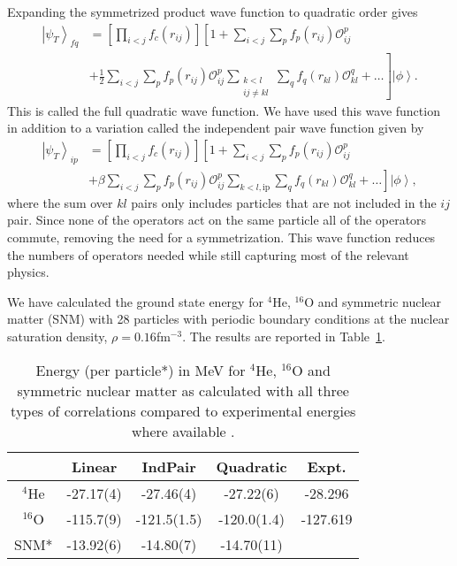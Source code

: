 \documentclass[12pt]{article}
\newcommand{\ket}[1]{\left| #1 \right>}
\newcommand{\fpij}{f_p(r_{ij})}
\newcommand{\Opij}{\mathcal{O}_{ij}^p}
\newcommand{\fOpij}{\sum\limits_{i<j}\sum\limits_p \fpij\Opij}
\newcommand{\fqkl}{f_q(r_{kl})}
\newcommand{\Oqkl}{\mathcal{O}_{kl}^q}
\newcommand{\fOqklip}{\sum\limits_{k<l,\mathrm{ip}}\sum\limits_q \fqkl\Oqkl}
\newcommand{\fOqklquad}{\sum_{\substack{k<l\\ij \ne kl}}\sum\limits_q \fqkl\Oqkl}
\begin{document}
Expanding the symmetrized product wave function to quadratic order gives
\begin{equation}
\begin{split}
   \ket{\psi_T}_{fq} &= \left[\prod\limits_{i<j}f_c(r_{ij})\right] \left[1+\fOpij\right. \\
      & + \left.\frac{1}{2}\fOpij\fOqklquad + \ldots \right] \ket{\phi}.
\end{split}
\end{equation}
This is called the full quadratic wave function. We have used this wave function in addition to a variation called the independent pair wave function given by
\begin{equation}
\begin{split}
   \ket{\psi_T}_{ip} &= \left[\prod\limits_{i<j}f_c(r_{ij})\right] \left[1+\fOpij\right. \\
   & + \left.\beta\fOpij\fOqklip + \ldots \right] \ket{\phi},
\end{split}
\end{equation}
where the sum over $kl$ pairs only includes particles that are not included in the $ij$ pair. Since none of the operators act on the same particle all of the operators commute, removing the need for a symmetrization. This wave function reduces the numbers of operators needed while still capturing most of the relevant physics.

We have calculated the ground state energy for $^4$He, $^{16}$O and symmetric nuclear matter (SNM) with 28 particles with periodic boundary conditions at the nuclear saturation density, $\rho=0.16$fm$^{-3}$. The results are reported in Table~\ref{tab:results}.
\begin{table}[h!]
   \centering
   \caption{Energy (per particle*) in MeV for $^4$He, $^{16}$O and symmetric nuclear matter as calculated with all three types of correlations compared to experimental energies where available \cite{wang2012}.}
   \label{tab:results}
   \begin{tabular}{ccccc}
      \hline \hline
       & Linear & IndPair & Quadratic & Expt.\\
      \hline
      $^4$He & -27.17(4) & -27.46(4) & -27.22(6) & -28.296\\
      $^{16}$O & -115.7(9) & -121.5(1.5) & -120.0(1.4) & -127.619\\
      SNM* & -13.92(6) & -14.80(7) & -14.70(11) & \\
      \hline \hline
   \end{tabular}
\end{table}
\end{document}
